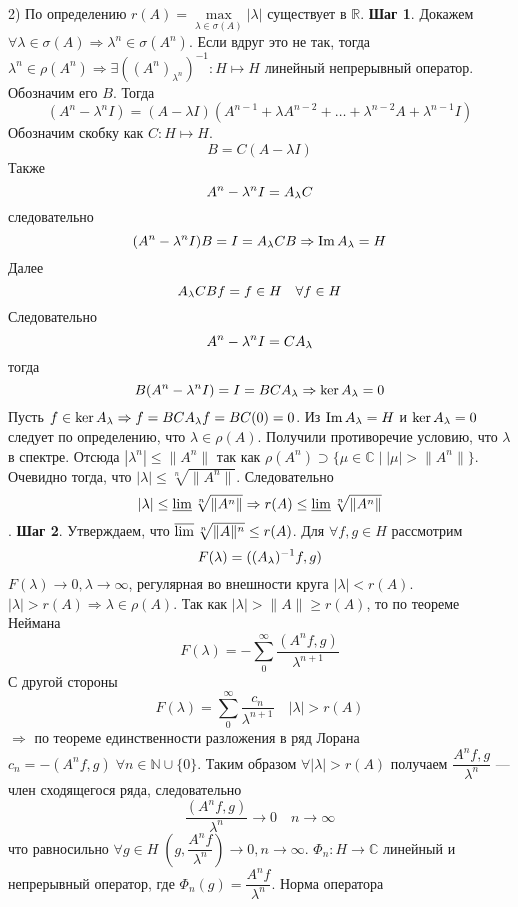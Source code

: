 \documentclass[14pt]{extarticle}
\begin{document}
\begin{Proof}
    2) По определению $r(A) = \max\limits_{\lambda \in \sigma(A)} |\lambda|$ существует в $\mathbb R$.
    \textbf{Шаг 1}.
    Докажем $\forall \lambda \in \sigma(A) \Rightarrow \lambda^n \in \sigma(A^n)$. 
    Если вдруг это не так, тогда $\lambda^n \in \rho(A^n) \Rightarrow \exists ((A^n)_{\lambda^n})^{-1} : H \mapsto H$ линейный непрерывный оператор. 
    Обозначим его $B$. 
    Тогда
    $$
    (A^n - \lambda^n I) = (A - \lambda I)(A^{n - 1} + \lambda A^{n - 2} + \dots + \lambda^{n - 2} A + \lambda^{n - 1} I)
    $$
    Обозначим скобку как $C : H \mapsto H$.
    $$
    B = C(A - \lambda I)
    $$
    Также
    $$
    A^n - \lambda^n I = \Al C
    $$
    следовательно 
    $$
    (A^n - \lambda^n I) B = I = \Al C B \Rightarrow \Im \Al = H
    $$
    Далее 
    $$
    \Al CBf = f \in H\quad \forall f \in H
    $$
    Следовательно
    $$
    A^n - \lambda^n I = C\Al
    $$
    тогда
    $$
    B(A^n - \lambda^n I) = I = B C \Al \Rightarrow \ker \Al = 0
    $$
    Пусть $f \in \ker \Al \Rightarrow f = B C \Al f = B C(0) = 0$.
    Из $\Im \Al = H$ и $\ker \Al = 0$ следует по определению, что $\lambda \in \rho(A)$.
    Получили противоречие условию, что $\lambda$ в спектре.
    Отсюда $|\lambda^n| \le \|A^n\|$ так как $\rho(A^n) \supset \{\mu \in \mathbb C \mid |\mu| > \|A^n\|\}$.
    Очевидно тогда, что $|\lambda| \le \sqrt[n]{\|A^n\|}$.
    Следовательно
    $$
    |\lambda| \le \varliminf \sqrt[n]{\|A^n\|} \Rightarrow r(A) \le \varliminf \sqrt[n]{\|A^n\|}
    $$.
    \textbf{Шаг 2}.
    Утверждаем, что $\varlimsup \sqrt[n]{\|A\|^n} \le r(A)$.
    Для $\forall f, g \in H$ рассмотрим 
    $$
    F(\lambda) = ((A_\lambda)^{-1} f, g)
    $$
    $F(\lambda) \to 0, \lambda \to \infty$, регулярная во внешности круга $|\lambda| < r(A)$.
    $|\lambda| > r(A) \Rightarrow \lambda \in \rho(A)$. Так как $|\lambda| > \|A\| \ge r(A)$, то по теореме Неймана
    $$
    F(\lambda) = - \sum_0^\infty \dfrac{(A^n f, g)}{\lambda^{n + 1}}
    $$
    С другой стороны
    $$F(\lambda) = \sum_0^\infty \dfrac{c_n}{\lambda^{n + 1}}\quad |\lambda|>r(A)
    $$
    $\Rightarrow$ по теореме единственности разложения в ряд Лорана
    $c_n = - (A^n f, g)\;\forall n \in \mathbb N \cup \{0\}$.
    Таким образом $\forall |\lambda| > r(A)$ получаем $\dfrac{A^n f, g}{\lambda^n}$ --- член сходящегося ряда, следовательно
    $$
    \dfrac{(A^n f, g)}{\lambda^n} \to 0\quad n \to \infty
    $$
    что равносильно $\forall g \in H\;(g, \dfrac{A^n f}{\lambda^n}) \to 0, n \to \infty$.
    $\Phi_n : H \to \mathbb C$ линейный и непрерывный оператор, где $\Phi_n(g) = \dfrac{A^n f}{\lambda^n}$.
    Норма оператора

\end{Proof}
\end{document}
